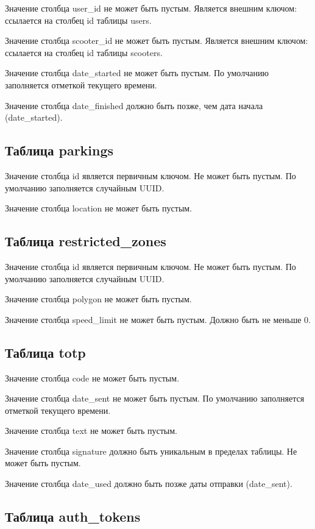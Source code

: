 Значение столбца user\_id не может быть пустым. Является внешним ключом: ссылается на столбец id таблицы users.

Значение столбца scooter\_id не может быть пустым. Является внешним ключом: ссылается на столбец id таблицы scooters.

Значение столбца date\_started не может быть пустым. По умолчанию заполняется отметкой текущего времени.

Значение столбца date\_finished должно быть позже, чем дата начала (date\_started).

\subsection{Таблица parkings}

Значение столбца id является первичным ключом. Не может быть пустым. По умолчанию заполняется случайным UUID.

Значение столбца location не может быть пустым.

\subsection{Таблица restricted\_zones}

Значение столбца id является первичным ключом. Не может быть пустым. По умолчанию заполняется случайным UUID.

Значение столбца polygon не может быть пустым.

Значение столбца speed\_limit не может быть пустым. Должно быть не меньше 0.

\subsection{Таблица totp}

Значение столбца code не может быть пустым.

Значение столбца date\_sent не может быть пустым. По умолчанию заполняется отметкой текущего времени.

Значение столбца text не может быть пустым.

Значение столбца signature должно быть уникальным в пределах таблицы. Не может быть пустым.

Значение столбца date\_used должно быть позже даты отправки (date\_sent).

\subsection{Таблица auth\_tokens}

